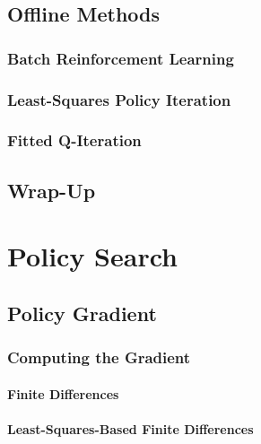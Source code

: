 	\section{Offline Methods} %

		\subsection{Batch Reinforcement Learning} %

		\subsection{Least-Squares Policy Iteration} %

		\subsection{Fitted Q-Iteration} %

	\section{Wrap-Up} %

\chapter{Policy Search} %

	\section{Policy Gradient} %

		\subsection{Computing the Gradient} %

			\subsubsection{Finite Differences} %

			\subsubsection{Least-Squares-Based Finite Differences} %

